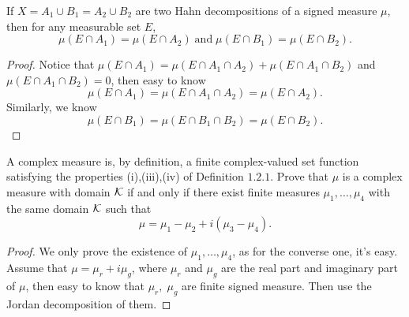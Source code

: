 \begin{pro}%
	If $X=A_1\cup B_1=A_2\cup B_2$ are two Hahn decompositions of a signed measure $\mu$, then for any measurable set $E$,
	\[\mu(E\cap A_1)=\mu(E\cap A_2)\;\mbox{and}\;\mu(E\cap B_1)=\mu(E\cap B_2).\]
\end{pro}
\begin{proof}
	Notice that $\mu(E\cap A_1)=\mu(E\cap A_1\cap A_2)+\mu(E\cap A_1\cap B_2)$ and $\mu(E\cap A_1\cap B_2)=0$, then easy to know
	\[\mu(E\cap A_1)=\mu(E\cap A_1\cap A_2)=\mu(E\cap A_2).\]
	Similarly, we know
	\[\mu(E\cap B_1)=\mu(E\cap B_1\cap B_2)=\mu(E\cap B_2).\]
\end{proof}

\begin{pro}%
	A complex measure is, by definition, a finite complex-valued set function satisfying the properties (i),(iii),(iv) of Definition $1.2.1$. Prove that $\mu$ is a complex measure with domain $\mathcal{K}$ if and only if there exist finite measures $\mu_1,\ldots,\mu_4$ with the same domain $\mathcal{K}$ such that
	\[\mu=\mu_1-\mu_2+i(\mu_3-\mu_4).\]
\end{pro}
\begin{proof}
	We only prove the existence of $\mu_1,\ldots,\mu_4$, as for the converse one, it's easy. Assume that $\mu=\mu_r+i\mu_g$, where $\mu_r$ and $\mu_g$ are the real part and imaginary part of $\mu$, then easy to know that $\mu_r,\;\mu_g$ are finite signed measure. Then use the Jordan decomposition of them.
\end{proof}
